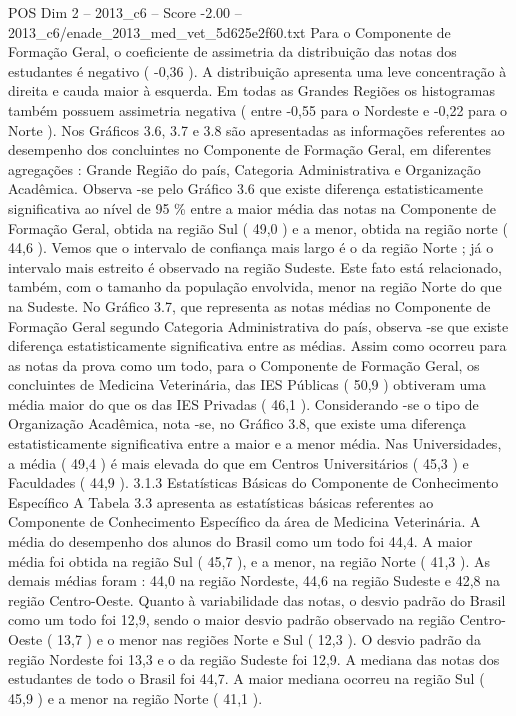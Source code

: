 \begin{textsample}{POS Dim 2 – 2013\_c6 – Score -2.00 – 2013\_c6/enade\_2013\_med\_vet\_5d625e2f60.txt}
Para o Componente de Formação Geral, o coeficiente de assimetria da distribuição das notas dos estudantes é negativo ( -0,36 ).
A distribuição apresenta uma leve concentração à direita e cauda maior à esquerda.
Em todas as Grandes Regiões os histogramas também possuem assimetria negativa ( entre -0,55 para o Nordeste e -0,22 para o Norte ).
Nos Gráficos 3.6, 3.7 e 3.8 são apresentadas as informações referentes ao desempenho dos concluintes no Componente de Formação Geral, em diferentes agregações : Grande Região do país, Categoria Administrativa e Organização Acadêmica.
Observa -se pelo Gráfico 3.6 que existe diferença estatisticamente significativa ao nível de 95 \% entre a maior média das notas na Componente de Formação Geral, obtida na região Sul ( 49,0 ) e a menor, obtida na região norte ( 44,6 ).
Vemos que o intervalo de confiança mais largo é o da região Norte ; já o intervalo mais estreito é observado na região Sudeste.
Este fato está relacionado, também, com o tamanho da população envolvida, menor na região Norte do que na Sudeste.
No Gráfico 3.7, que representa as notas médias no Componente de Formação Geral segundo Categoria Administrativa do país, observa -se que existe diferença estatisticamente significativa entre as médias.
Assim como ocorreu para as notas da prova como um todo, para o Componente de Formação Geral, os concluintes de Medicina Veterinária, das IES Públicas ( 50,9 ) obtiveram uma média maior do que os das IES Privadas ( 46,1 ).
Considerando -se o tipo de Organização Acadêmica, nota -se, no Gráfico 3.8, que existe uma diferença estatisticamente significativa entre a maior e a menor média.
Nas Universidades, a média ( 49,4 ) é mais elevada do que em Centros Universitários ( 45,3 ) e Faculdades ( 44,9 ). 3.1.3 Estatísticas Básicas do Componente de Conhecimento Específico A Tabela 3.3 apresenta as estatísticas básicas referentes ao Componente de Conhecimento Específico da área de Medicina Veterinária.
A média do desempenho dos alunos do Brasil como um todo foi 44,4.
A maior média foi obtida na região Sul ( 45,7 ), e a menor, na região Norte ( 41,3 ).
As demais médias foram : 44,0 na região Nordeste, 44,6 na região Sudeste e 42,8 na região Centro-Oeste.
Quanto à variabilidade das notas, o desvio padrão do Brasil como um todo foi 12,9, sendo o maior desvio padrão observado na região Centro-Oeste ( 13,7 ) e o menor nas regiões Norte e Sul ( 12,3 ).
O desvio padrão da região Nordeste foi 13,3 e o da região Sudeste foi 12,9.
A mediana das notas dos estudantes de todo o Brasil foi 44,7.
A maior mediana ocorreu na região Sul ( 45,9 ) e a menor na região Norte ( 41,1 ).

\end{textsample}
